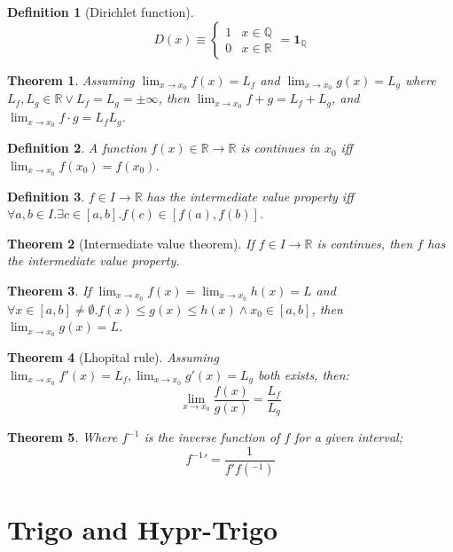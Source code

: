 \documentclass[]{article}
\newtheorem{theorem}{Theorem}[section]
\newtheorem{definition}{Definition}[section]
\newcommand\R     {\mathbb{R}}
\newcommand\Q     {\mathbb{Q}}
\newcommand\limxz {\lim_{x \to x_0}}
\renewcommand\inf {\infty}
\newcommand\op    {^{-1}}
\begin{document}
\begin{multicols}{2}
		\begin{definition}[Dirichlet function]
			\[ D(x) \equiv \begin{cases}
				1 & x \in \Q \\
				0 & x \in \R
			\end{cases} = \mathbf{1}_\Q \]
		\end{definition}
		
		\begin{theorem}
			Assuming $\limxz f(x) = L_f $ and $\limxz g(x) = L_g$ where $L_f, L_g \in \R \lor L_f = L_g = \pm\inf$, then $\limxz f + g = L_f + L_g$, and $\limxz f \cdot g = L_fL_g$. 
		\end{theorem}
		
		\begin{definition}
			A function $f(x) \in \R \to \R$ is continues in $x_0$ iff $\limxz f(x_0) = f(x_0)$. 
		\end{definition}
		
		\begin{definition}
			$f \in I \to \R$ has the intermediate value property iff $\forall a, b \in I. \exists c \in [a, b]. f(c) \in [f(a), f(b)]$. 
		\end{definition}
		
		\begin{theorem}[Intermediate value theorem]
			If $f \in I \to \R$ is continues, then $f$ has the intermediate value property. 
		\end{theorem}
		
		\begin{theorem}
			If $\limxz f(x) = \limxz h(x) = L$ and $\forall x \in [a, b] \neq \emptyset. f(x) \le g(x) \le h(x) \land x_0 \in [a, b]$, then $\limxz g(x) = L$. 
		\end{theorem}
		
		\begin{theorem}[Lhopital rule]
		Assuming $\limxz f'(x) = L_f, \limxz g'(x) = L_g$ both exists, then: 
		\[ \limxz \frac{f(x)}{g(x)} = \frac{L_f}{L_g} \]
		\end{theorem}
		
		\begin{theorem}
			Where $ f\op $ is the inverse function of $f$ for a given interval;
			\[ f\op{'} = \frac{1}{f'f(\op)} \]
		\end{theorem}
		
		
		
		\section{Trigo and Hypr-Trigo}
		

\end{multicols}
\end{document}
